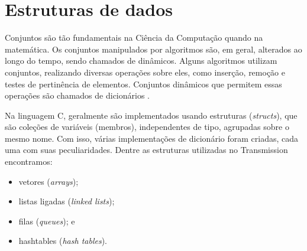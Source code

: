
\section{Estruturas de dados}

Conjuntos são tão fundamentais na Ciência da Computação quando na matemática. Os
conjuntos manipulados por algoritmos são, em geral, alterados ao longo do tempo, sendo
chamados de dinâmicos. Alguns algoritmos utilizam conjuntos, realizando diversas
operações sobre eles, como inserção, remoção e testes de pertinência de elementos.
Conjuntos dinâmicos que permitem essas operações são chamados de dicionários
\cite{book:clrs}.

Na linguagem C, geralmente são implementados usando estruturas (\emph{structs}), que são
coleções de variáveis (membros), independentes de tipo, agrupadas sobre o mesmo nome.
Com isso, várias implementações de dicionário foram criadas, cada uma com suas
peculiaridades. Dentre as estruturas utilizadas no Transmission encontramos:

\begin{itemize}
    \item vetores (\emph{arrays});
    \item listas ligadas (\emph{linked lists});
    \item filas (\emph{queues}); e
    \item \glspl*{hashtable} (\emph{hash tables}).
\end{itemize}





